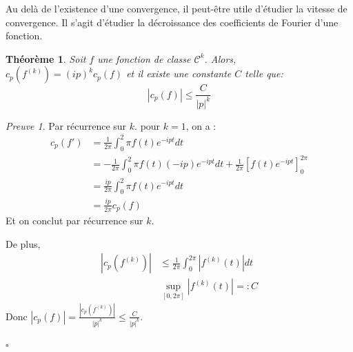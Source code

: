 \documentclass[]{article}
\newtheorem{mythm}{Théorème}
\theoremstyle{remark}
\newtheorem{myproof}{Preuve}
\theoremstyle{definition}
\newcommand{\cqfd}{
	\hfill$\square$
}
\newcommand{\DS}{\displaystyle}
\begin{document}
	
			
	Au delà de l'existence d'une convergence, il peut-être utile d'étudier la vitesse de convergence. Il s'agit d'étudier la décroissance des coefficients de Fourier d'une fonction. 
	
	\begin{mythm}
		Soit $f$ une fonction de classe $\mathcal{C}^k$. Alors, $c_p(f^{(k)}) = (ip)^kc_p(f)$ et il existe une constante $C$ telle que:
			$$ | c_p(f) | \leqslant \frac{C}{|p|^k} $$
	\end{mythm}
	
	\begin{myproof}
		Par récurrence sur $k$. 
		pour $k=1$, on a :
			\begin{align*}
			c_p(f') &= \frac{1}{2\pi}\int_0^2\pi f(t)e^{-ipt}dt \\
					&= -\frac{1}{2\pi}\int_0^2\pi f(t)(-ip) e^{-ipt}dt + \frac{1}{2\pi}\left[f(t)e^{-ipt} \right]_0^{2\pi} \\
					& = \frac {ip}{2\pi} \int_0^2\pi f(t)e^{-ipt}dt \\
					& = \frac {ip}{2\pi} c_p(f)
			\end{align*}
			Et on conclut par récurrence sur $k$.
		
		De plus, 
		\begin{align*}
		|c_p(f^{(k)})| &\leqslant \frac{1}{2\pi}\int_0^{2\pi}|f^{(k)}(t)|dt \\
		& \sup_{[0, 2\pi]} |f^{(k)}(t)| =: C 
		\end{align*}
		Donc $ \DS|c_p(f)| = \frac {|c_p(f^{(k)})|}{|p|^k} \leqslant \frac{C}{|p|^k} $.
		\cqfd		
	\end{myproof}
		
	
	\newpage
	
\end{document}

